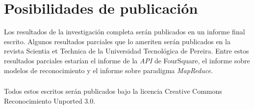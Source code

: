 \chapter{Posibilidades de publicaci\'on}
\label{sec:posibilidades}
Los resultados de la investigaci\'on completa ser\'an publicados en un informe final escrito. Algunos resultados parciales que lo ameriten ser\'an publicados en la revista Scientia et Technica de la Universidad Tecnol\'ogica de Pereira. Entre estos resultados parciales estar\'ian el informe de la \textit{API} de FourSquare, el informe sobre modelos de reconocimiento y el informe sobre paradigma \textit{MapReduce}.
\paragraph{}
Todos estos escritos ser\'an publicados bajo la licencia Creative Commons Reconocimiento Unported 3.0.
\pagebreak